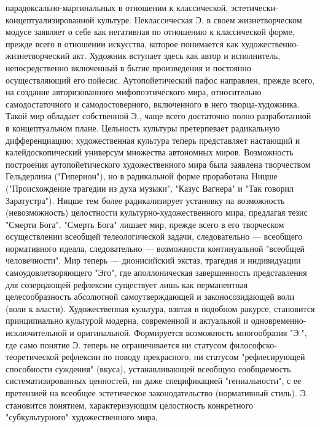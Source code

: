 \documentclass[12pt]{article}
\begin{document}
парадоксально-маргинальных  в  отношении  к  классической,  эстетически-концептуализированной  культуре.
Неклассическая  Э.  в  своем  жизнетворческом  модусе  заявляет  о  себе  как  негативная  по  отношению  к
классической  форме,  прежде  всего  в  отношении  искусства,  которое  понимается  как  художественно-жизнетворческий акт. Художник вступает здесь как автор и исполнитель, непосредственно включенный в бытие
произведения и постоянно осуществляющий его пойесис. Аутопойетический пафос направлен, прежде всего, на
создание  авторизованного  мифопоэтического  мира,  относительно  самодостаточного  и  самодостоверного,
включенного  в  него  творца-художника.  Такой  мир  обладает  собственной  Э.,  чаще  всего  достаточно  полно
разработанной  в  концептуальном  плане.  Цельность  культуры  претерпевает  радикальную  дифференциацию;
художественная  культура  теперь  представляет  настающий  и  калейдоскопический  универсум  множества
автономных  миров.  Возможность  построения  аутопойетического  художественного  мира  была  заявлена
творчеством  Гельдерлина  ("Гиперион"),  но  в  радикальной  форме  проработана  Ницше  ("Происхождение
трагедии из духа музыки", "Казус Вагнера" и "Так говорил Заратустра"). Ницше тем более радикализирует
установку  на  возможность (невозможность)  целостности  культурно-художественного  мира, предлагая тезис
"Смерти  Бога".  "Смерть  Бога"  лишает  мир,  прежде  всего  в  его  творческом  осуществлении  всеобщей
телеологической  задачи,  следовательно  —  всеобщего  нормативного  идеала,  следовательно  —  возможности
континуальной  "всеобщей  человечности".  Мир  теперь  —  дионисийский  экстаз,  трагедия  и  индивидуации
самоудовлетворяющего "Эго", где аполлоническая завершенность представления для созерцающей рефлексии
существует лишь как перманентная целесообразность абсолютной самоутверждающей и законосозидающей
воли  (воли  к  власти).  Художественная  культура,  взятая  в  подобном  ракурсе,  становится  принципиально
культурой модерна, современной и актуальной и одновременно-исключительной и оригинальной. Формируется
возможность  многообразия  "Э.",  где  само  понятие  Э.  теперь  не  ограничивается  ни  статусом  философско-теоретической  рефлексии  по  поводу  прекрасного,  ни  статусом  "рефлесирующей  способности  суждения"
(вкуса), устанавливающей всеобщую сообщаемость систематизированных ценностей, ни даже спецификацией
"гениальности",  с  ее  претензией  на  всеобщее  эстетическое  законодательство  (нормативный  стиль).  Э.
становится  понятием,  характеризующим  целостность  конкретного  "субкультурного"  художественного  мира,
\end{document}
